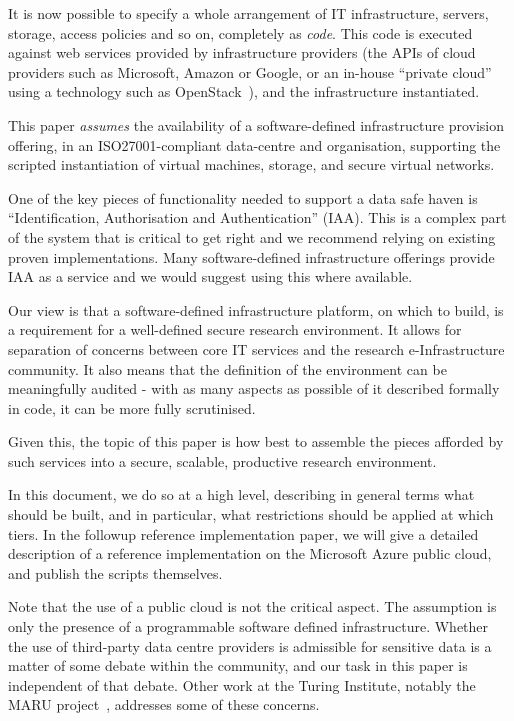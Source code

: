 \documentclass[10pt,a4paper,twocolumn]{article}
\begin{document}
It is now possible to specify a whole arrangement of IT infrastructure, servers, storage, access policies and so on,
completely as \emph{code}. This code is executed against web services provided by infrastructure providers (the APIs
of cloud providers such as Microsoft, Amazon or Google, or an in-house ``private cloud'' using a technology such
as OpenStack~\cite{openstack}), and the infrastructure instantiated.

This paper \emph{assumes} the availability of a software-defined infrastructure provision offering, in an ISO27001-compliant data-centre and organisation, supporting the scripted instantiation of virtual machines, storage,
and secure virtual networks. 

One of the key pieces of functionality needed to support a data safe haven is ``Identification, Authorisation and Authentication'' (IAA). This is a complex part of the system that is critical to get right and we recommend relying on existing proven implementations. Many software-defined infrastructure offerings provide IAA as a service and we would suggest using this where available.

Our view is that a software-defined infrastructure platform, on which to build,
is a requirement for a well-defined secure research environment. It allows for separation of concerns between
core IT services and the research e-Infrastructure community.
It also means that the definition of the environment can be meaningfully audited - 
with as many aspects as possible of it described formally in code, it can be more fully scrutinised.

Given this, the topic of this paper is how best to assemble the pieces afforded by such services into 
a secure, scalable, productive research environment.

In this document, we do so at a high level, describing in general terms what should be built,
and in particular, what restrictions should be applied at which tiers.
In the followup reference implementation paper, we will give a detailed description
of a reference implementation on the Microsoft Azure public cloud, and publish the scripts
themselves.

Note that the use of a public cloud is not the critical aspect. The assumption is only
the presence of a programmable software defined infrastructure.
Whether the use of third-party data centre providers is admissible for
sensitive data is a matter of some debate within
the community, and our task in this paper is independent of that debate. Other work at the Turing Institute, notably the MARU project~\cite{maru}, addresses some of these concerns.
\end{document}
